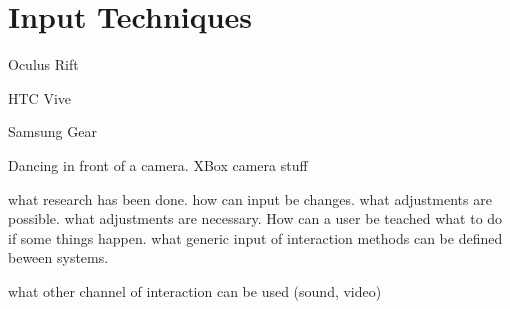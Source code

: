 \section{Input Techniques}

Oculus Rift

HTC Vive

Samsung Gear

Dancing in front of a camera. XBox camera stuff

what research has been done. how can input be changes. what adjustments are possible. what adjustments are necessary. How can a user be teached what to do if some things happen. what generic input of interaction methods can be defined beween systems.

what other channel of interaction can be used (sound, video)
